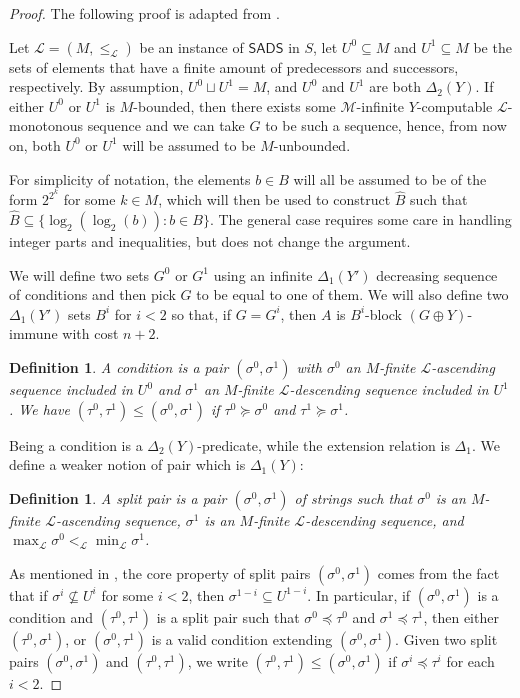 \documentclass{article}
\def\L{\mathcal{L}}
\def\M{\mathcal{M}}
\newcommand{\SADS}[0]{\mathsf{SADS}}
\numberwithin{theorem}{section}
\newtheorem{definition}[theorem]{Definition}
\begin{document}
\begin{proof}
The following proof is adapted from \cite[Proposition 3.17]{houerou2025conservation}.


Let $\L = (M, \leq_\L)$ be an instance of $\SADS$ in $S$, let $U^0 \subseteq M$ and $U^1 \subseteq M$ be the sets of elements that have a finite amount of predecessors and successors, respectively. By assumption, $U^0 \sqcup U^1 = M$, and $U^0$ and $U^1$ are both $\Delta_2(Y)$. If either $U^0$ or $U^1$ is $M$-bounded, then there exists some $\M$-infinite $Y$-computable $\L$-monotonous sequence and we can take $G$ to be such a sequence, hence, from now on, both $U^0$ or $U^1$ will be assumed to be $M$-unbounded. 

For simplicity of notation, the elements $b \in B$ will all be assumed to be of the form $2^{2^k}$ for some $k \in M$, which will then be used to construct $\hat{B}$ such that $\hat{B} \subseteq \{\log_2(\log_2(b)) : b \in B\}$. The general case requires some care in handling integer parts and inequalities, but does not change the argument. 

We will define two sets $G^0$ or $G^1$ using an infinite $\Delta_1(Y')$ decreasing sequence of conditions and then pick $G$ to be equal to one of them. We will also define two $\Delta_1(Y')$ sets $B^i$ for $i < 2$ so that, if $G = G^i$, then $A$ is $B^i$-block $(G \oplus Y)$-immune with cost $n+2$.

\begin{definition}
A \emph{condition} is a pair $(\sigma^0, \sigma^1)$ with $\sigma^0$ an $M$-finite $\L$-ascending sequence included in $U^0$ and $\sigma^1$ an $M$-finite $\L$-descending sequence included in $U^1$. We have $(\tau^0, \tau^1) \leq (\sigma^0, \sigma^1)$ if $\tau^0 \succeq \sigma^0$ and $\tau^1 \succeq \sigma^1$.
\end{definition}

Being a condition is a $\Delta_2(Y)$-predicate, while the extension relation is $\Delta_1$. We define a weaker notion of pair which is $\Delta_1(Y)$:
\begin{definition}
A \emph{split pair} is a pair $(\sigma^0, \sigma^1)$ of strings such that $\sigma^0$ is an $M$-finite $\L$-ascending sequence, $\sigma^1$ is an $M$-finite $\L$-descending sequence, and $\max_\L \sigma^0 <_\L \min_\L \sigma^1$.
\end{definition}

As mentioned in , the core property of split pairs $(\sigma^0, \sigma^1)$ comes from the fact that if $\sigma^i \not \subseteq U^i$ for some $i < 2$, then $\sigma^{1-i} \subseteq U^{1-i}$. In particular, if $(\sigma^0, \sigma^1)$ is a condition and $(\tau^0, \tau^1)$ is a split pair such that $\sigma^0 \preceq \tau^0$ and $\sigma^1 \preceq \tau^1$, then either $(\tau^0, \sigma^1)$, or $(\sigma^0, \tau^1)$ is a valid condition extending $(\sigma^0, \sigma^1)$. Given two split pairs $(\sigma^0, \sigma^1)$ and $(\tau^0, \tau^1)$, we write $(\tau^0, \tau^1) \leq (\sigma^0, \sigma^1)$ if $\sigma^i \preceq \tau^i$ for each~$i < 2$.


\end{proof}
\end{document}
